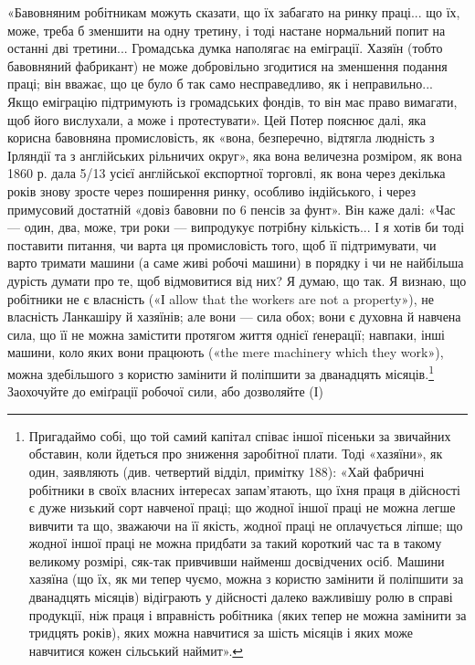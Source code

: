 «Бавовняним робітникам можуть сказати, що їх забагато на
ринку праці... що їх, може, треба б зменшити на одну третину,
і тоді настане нормальний попит на останні дві третини... Громадська
думка наполягає на еміграції. Хазяїн (тобто бавовняний
фабрикант) не може добровільно згодитися на зменшення подання
праці; він вважає, що це було б так само несправедливо, як
і неправильно... Якщо еміграцію підтримують із громадських
фондів, то він має право вимагати, щоб його вислухали, а може
і протестувати». Цей Потер пояснює далі, яка корисна бавовняна
промисловість, як «вона, безперечно, відтягла людність з Ірляндії
та з англійських рільничих округ», яка вона величезна розміром,
як вона 1860 р. дала 5/13 усієї англійської експортної
торговлі, як вона через декілька років знову зросте через поширення
ринку, особливо індійського, і через примусовий достатній
«довіз бавовни по 6 пенсів за фунт». Він каже далі: «Час — один,
два, може, три роки — випродукує потрібну кількість... І я хотів би
тоді поставити питання, чи варта ця промисловість того, щоб її
підтримувати, чи варто тримати машини (а саме живі робочі
машини) в порядку і чи не найбільша дурість думати про те, щоб
відмовитися від них? Я думаю, що так. Я визнаю, що робітники
не є власність («І allow that the workers are not a property»),
не власність Ланкашіру й хазяїнів; але вони — сила обох; вони
є духовна й навчена сила, що її не можна замістити протягом
життя однієї ґенерації; навпаки, інші машини, коло яких вони
працюють («the mere machinery which they work»), можна здебільшого
з користю замінити й поліпшити за дванадцять місяців.\footnote{
Пригадаймо собі, що той самий капітал співає іншої пісеньки за
звичайних обставин, коли йдеться про зниження заробітної плати. Тоді
«хазяїни», як один, заявляють (див. четвертий відділ, примітку 188):
«Хай фабричні робітники в своїх власних інтересах запам’ятають, що їхня
праця в дійсності є дуже низький сорт навченої праці; що жодної іншої
праці не можна легше вивчити та що, зважаючи на її якість, жодної
праці не оплачується ліпше; що жодної іншої праці не можна придбати
за такий короткий час та в такому великому розмірі, сяк-так привчивши
найменш досвідчених осіб. Машини хазяїна (що їх, як ми тепер
чуємо, можна з користю замінити й поліпшити за дванадцять місяців)
відіграють у дійсності далеко важливішу ролю в справі продукції, ніж
праця і вправність робітника (яких тепер не можна замінити за тридцять
років), яких можна навчитися за шість місяців і яких може навчитися
кожен сільський наймит».
}
Заохочуйте до еміґрації робочої сили, або дозволяйте (І)
